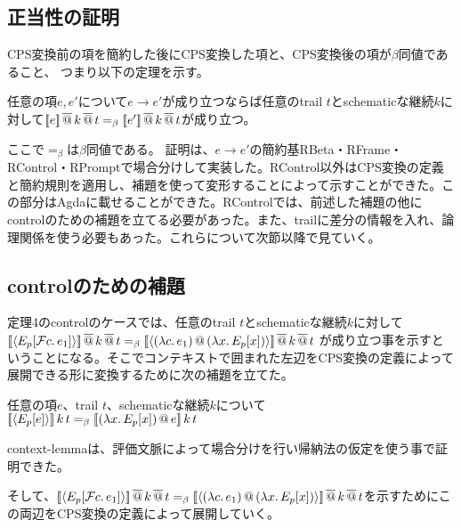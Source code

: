\subsection{正当性の証明}
CPS変換前の項を簡約した後にCPS変換した項と、CPS変換後の項が$\beta$同値であること、
つまり以下の定理を示す。
\begin{theorem}[正当性の証明]\upshape
  任意の項$e$,$\, e'$について$e \to e'$が成り立つならば任意のtrail $t$とschematicな継続$k$に対して$[\![{e}]\!]\,\overline{@}\, k \,\overline{@}\, t =_{\beta} [\![{e'}]\!] \,\overline{@}\, k \,\overline{@}\, t$が成り立つ。
\end{theorem}

ここで$=_{\beta}$は$\beta$同値である。
証明は、$e \to e'$の簡約基\textsf{RBeta}・\textsf{RFrame}・\textsf{RControl}・\textsf{RPrompt}で場合分けして実装した。\textsf{RControl}以外はCPS変換の定義と簡約規則を適用し、補題を使って変形することによって示すことができた。この部分はAgdaに載せることができた。\textsf{RControl}では、前述した補題の他にcontrolのための補題を立てる必要があった。また、trailに差分の情報を入れ、論理関係を使う必要もあった。これらについて次節以降で見ていく。


\subsection{controlのための補題}
定理4のcontrolのケースでは、任意のtrail $t$とschematicな継続$k$に対して\\
$[\![{\langle{E_p[{\cal F}{c}.\,{e_1}]}\rangle}]\!]\,\overline{@}\, k \,\overline{@}\, t =_{\beta} [\![{\langle{{(\lambda{c}.\,{e_1})}\,@\,{(\lambda{x}.\,{E_p[x]})}}\rangle}]\!] \,\overline{@}\, k \,\overline{@}\, t$ が成り立つ事を示すということになる。そこでコンテキストで囲まれた左辺をCPS変換の定義によって展開できる形に変換するために次の補題を立てた。

\begin{lemma}\upshape
  任意の項$e$、trail $t$、schematicな継続$k$について\\
  $[\![{\langle{E_p[e]}\rangle}]\!]\,k\,t =_{\beta} [\![{{(\lambda{x}.\,{E_p[x]})}\,@\,{e}}]\!]\,k\,t$
\end{lemma}
context-lemmaは、評価文脈によって場合分けを行い帰納法の仮定を使う事で証明できた。

そして、$[\![{\langle{E_p[{\cal F}{c}.\,{e_1}]}\rangle}]\!]\,\overline{@}\, k \,\overline{@}\, t =_{\beta} [\![{\langle{{(\lambda{c}.\,{e_1})}\,@\,{(\lambda{x}.\,{E_p[x]})}}\rangle}]\!] \,\overline{@}\, k \,\overline{@}\, t$を示すためにこの両辺をCPS変換の定義によって展開していく。

